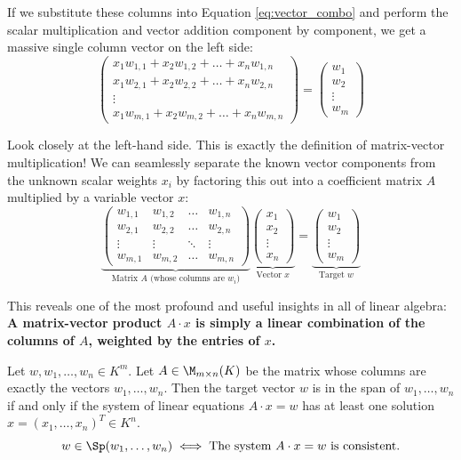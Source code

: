 If we substitute these columns into Equation \eqref{eq:vector_combo} and perform the scalar multiplication and vector addition component by component, we get a massive single column vector on the left side:
\[
\begin{pmatrix} 
x_1 w_{1,1} + x_2 w_{1,2} + \dots + x_n w_{1,n} \\ 
x_1 w_{2,1} + x_2 w_{2,2} + \dots + x_n w_{2,n} \\ 
\vdots \\ 
x_1 w_{m,1} + x_2 w_{m,2} + \dots + x_n w_{m,n} 
\end{pmatrix} 
= 
\begin{pmatrix} w_1 \\ w_2 \\ \vdots \\ w_m \end{pmatrix}
\]

Look closely at the left-hand side. This is exactly the definition of matrix-vector multiplication! We can seamlessly separate the known vector components from the unknown scalar weights $x_i$ by factoring this out into a coefficient matrix $A$ multiplied by a variable vector $x$:
\[
\underbrace{\begin{pmatrix} 
w_{1,1} & w_{1,2} & \dots & w_{1,n} \\ 
w_{2,1} & w_{2,2} & \dots & w_{2,n} \\ 
\vdots & \vdots & \ddots & \vdots \\ 
w_{m,1} & w_{m,2} & \dots & w_{m,n} 
\end{pmatrix}}_{\text{Matrix } A \text{ (whose columns are } w_i)}
\underbrace{\begin{pmatrix} x_1 \\ x_2 \\ \vdots \\ x_n \end{pmatrix}}_{\text{Vector } x}
= 
\underbrace{\begin{pmatrix} w_1 \\ w_2 \\ \vdots \\ w_m \end{pmatrix}}_{\text{Target } w}
\]

This reveals one of the most profound and useful insights in all of linear algebra: \textbf{A matrix-vector product $A \cdot x$ is simply a linear combination of the columns of $A$, weighted by the entries of $x$.} 

\begin{theorem}
Let $w, w_1, \dots, w_n \in K^m$. Let $A \in \M_{m \times n}(K)$ be the matrix whose columns are exactly the vectors $w_1, \dots, w_n$. Then the target vector $w$ is in the span of $w_1, \dots, w_n$ if and only if the system of linear equations $A \cdot x = w$ has at least one solution $x = (x_1, \dots, x_n)^T \in K^n$. 
\[
w \in \Sp(w_1, \dots, w_n) \iff \text{The system } A \cdot x = w \text{ is consistent.}
\]
\end{theorem}

